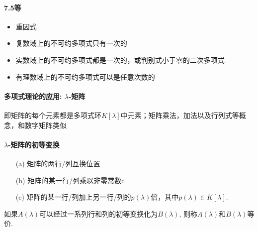\paragraph{7.5等}
\begin{itemize}
    \item 重因式
    \item 复数域上的不可约多项式只有一次的
    \item 实数域上的不可约多项式都是一次的，或判别式小于零的二次多项式
    \item 有理数域上的不可约多项式可以是任意次数的
\end{itemize}

\paragraph{多项式理论的应用: $\lambda$-矩阵}
即矩阵的每个元素都是多项式环$K[\lambda]$中元素；矩阵乘法，加法以及行列式等概念，和数字矩阵类似

\paragraph{$\lambda$-矩阵的初等变换}
\begin{itemize}
  \item [(a)] 矩阵的两行/列互换位置
  \item [(b)] 矩阵的某一行/列乘以非零常数c
  \item [(c)] 矩阵的某一行/列加上另一行/列的$p(\lambda)$倍，其中$p(\lambda) \in K[\lambda]$.
\end{itemize}
如果$A(\lambda)$可以经过一系列行和列的初等变换化为$B(\lambda)$,
则称$A(\lambda)$和$B(\lambda)$等价.

